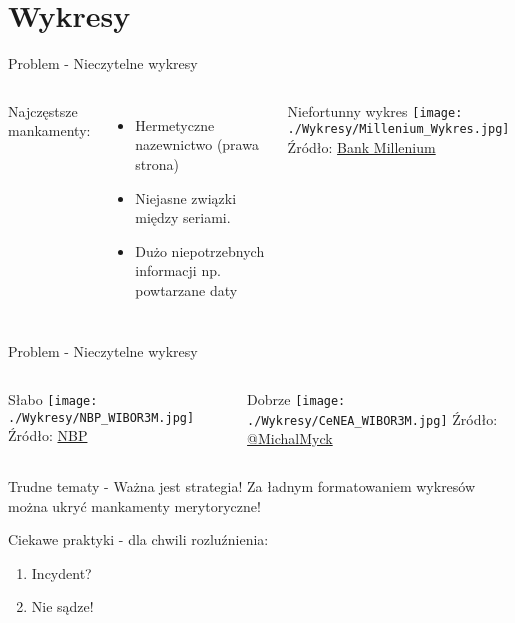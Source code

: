 \documentclass{beamer}
\begin{document}
\section{Wykresy}
\begin{frame}{Problem - Nieczytelne wykresy}
	\begin{columns}[t]
		Najczęstsze mankamenty:
		\begin{itemize}
			\item Hermetyczne nazewnictwo (prawa strona)
			\item Niejasne związki między seriami.
			\item Dużo niepotrzebnych informacji np. powtarzane daty
		\end{itemize}		

		\centering
		Niefortunny wykres
		\texttt{[image: ./Wykresy/Millenium\_Wykres.jpg]}
		\tiny
		Źródło: \href{https://www.bankmillennium.pl/documents/10184/29721383/Makro_i_Rynek_2022.pdf/}{Bank Millenium}  
	\end{columns}
\end{frame}

\begin{frame}{Problem - Nieczytelne wykresy}
	\begin{columns}[t]
		\centering
		Słabo
		\texttt{[image: ./Wykresy/NBP\_WIBOR3M.jpg]}
		\tiny
		Źródło: \href{https://www.nbp.pl/publikacje/materialy_i_studia/ms337.pdf}{NBP}  
		
		\centering
		Dobrze
		\texttt{[image: ./Wykresy/CeNEA\_WIBOR3M.jpg]}
		\tiny
		Źródło: \href{https://twitter.com/MichalMyck/status/1494312342984826890?s=20&t=NXvtdJQDxmTJo1QYSe-EhQ}{@MichalMyck}  
	\end{columns}
\end{frame}


\begin{frame}{Trudne tematy - Ważna jest strategia!}
	Za ładnym formatowaniem wykresów można ukryć mankamenty merytoryczne!
	\vspace{5mm}
	
	Ciekawe praktyki - dla chwili rozluźnienia:
	\begin{enumerate}
		\item Incydent? \href{https://www.youtube.com/watch?v=0OvL0eBS-GQ}{}
		\item Nie sądze!
		\href{https://www.youtube.com/watch?v=MVpddez7DLA}{}
	\end{enumerate}
	
\end{frame}
\end{document}
